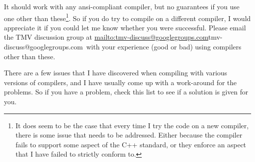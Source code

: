 \documentclass[twoside,letterpaper,11pt]{article}
\makeatletter
\newcommand{\mygroupx}{tmv-discuss@googlegroups.com}
\newcommand{\mygroup}{\url{mailto:\mygroupx}{\mygroupx}}
\makeatother
\begin{document}
It should work with any ansi-compliant
compiler, but no guarantees if you use one other than these\footnote{
It does seem to be the case that 
every time I try the code on a new compiler, there is some issue that needs to be addressed.  
Either because the compiler fails to support some aspect of the C++ standard, or they enforce
an aspect that I have failed to strictly conform to.}.
  So if you do try to compile on a different compiler, 
I would appreciate it if you could let me know whether you were successful.  
Please email the TMV discussion group at \mygroup\ with your experience (good or bad) using 
compilers other than these.

There are a few issues that I have discovered when compiling with various 
versions of compilers, and I have usually come up with a work-around for
the problems.  So if you have a problem, check this list to see if a solution
is given for you.  
\end{document}
